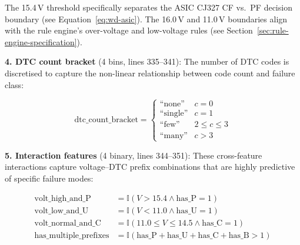 \documentclass[10pt,a4paper]{article}
\begin{document}
The 15.4\,V threshold specifically separates the ASIC CJ327 CF vs.\ PF decision boundary (see Equation~\ref{eq:wd-asic}). The 16.0\,V and 11.0\,V boundaries align with the rule engine's over-voltage and low-voltage rules (see Section~\ref{sec:rule-engine-specification}).

\textbf{4. DTC count bracket} (4 bins, lines 335--341): The number of DTC codes is discretised to capture the non-linear relationship between code count and failure class:

\begin{equation}
\text{dtc\_count\_bracket} = \begin{cases}
\text{``none''}   & c = 0 \\
\text{``single''} & c = 1 \\
\text{``few''}    & 2 \leq c \leq 3 \\
\text{``many''}   & c > 3
\end{cases}
\label{eq:dtc-count-bracket}
\end{equation}

\textbf{5. Interaction features} (4 binary, lines 344--351): These cross-feature interactions capture voltage--DTC prefix combinations that are highly predictive of specific failure modes:

\begin{align}
\text{volt\_high\_and\_P} &= \mathbb{I}(V > 15.4 \land \text{has\_P} = 1) \label{eq:int-volt-p} \\
\text{volt\_low\_and\_U}  &= \mathbb{I}(V < 11.0 \land \text{has\_U} = 1) \label{eq:int-volt-u} \\
\text{volt\_normal\_and\_C} &= \mathbb{I}(11.0 \leq V \leq 14.5 \land \text{has\_C} = 1) \label{eq:int-volt-c} \\
\text{has\_multiple\_prefixes} &= \mathbb{I}(\text{has\_P} + \text{has\_U} + \text{has\_C} + \text{has\_B} > 1) \label{eq:int-multi}
\end{align}
\end{document}
